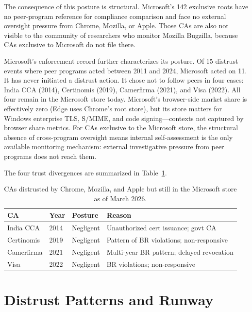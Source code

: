 \documentclass[10pt,twocolumn,letterpaper]{article}
\begin{document}
The consequence of this posture is structural. Microsoft's 142 exclusive
roots have no peer-program reference for compliance comparison and face no
external oversight pressure from Chrome, Mozilla, or Apple. Those CAs are
also not visible to the community of researchers who monitor Mozilla
Bugzilla, because CAs exclusive to Microsoft do not file there.

Microsoft's enforcement record further characterizes its posture. Of 15
distrust events where peer programs acted between 2011 and 2024, Microsoft
acted on 11. It has never initiated a distrust action. It chose not to
follow peers in four cases: India CCA (2014), Certinomis (2019),
Camerfirma (2021), and Visa (2022). All four remain in the Microsoft store
today. Microsoft's browser-side market share is effectively zero (Edge uses
Chrome's root store), but its store matters for Windows enterprise TLS,
S/MIME, and code signing---contexts not captured by browser share metrics.
For CAs exclusive to the Microsoft store, the structural absence of
cross-program oversight means internal self-assessment is the only
available monitoring mechanism: external investigative pressure from
peer programs does not reach them.

The four trust divergences are summarized in Table~\ref{tab:divergence}.

\begin{table}[t]
\centering
\footnotesize
\caption{CAs distrusted by Chrome, Mozilla, and Apple but still in the
Microsoft store as of March 2026.}
\label{tab:divergence}
\begin{tabularx}{\columnwidth}{@{}lllX@{}}
\toprule
CA & Year & Posture & Reason \\
\midrule
India CCA & 2014 & Negligent & Unauthorized cert issuance; govt CA \\
Certinomis & 2019 & Negligent & Pattern of BR violations; non-responsive \\
Camerfirma & 2021 & Negligent & Multi-year BR pattern; delayed revocation \\
Visa        & 2022 & Negligent & BR violations; non-responsive \\
\bottomrule
\end{tabularx}
\end{table}

\section{Distrust Patterns and Runway}
\label{sec:distrust}
\end{document}
